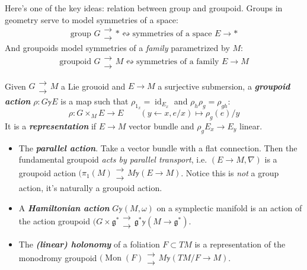 Here's one of the key ideas: relation between group and groupoid. Groups in geometry serve to model symmetries of a space:
\[\text{group } G \substack{\to\\\to} * \leftrightsquigarrow \text{symmetries of a space }E \to * \]
And groupoids model symmetries of a \textit{family} parametrized by \(M\):
\[\text{groupoid }G \substack{\to\\\to}M \leftrightsquigarrow \text{symmetries of a family }E \to M\]
\begin{defn}\leavevmode
Given \(G\substack{\to\\\to}M\) a Lie grouoid and \(E \to M\) a surjective submersion, a \textit{\textbf{groupoid action}} \(\rho:G \mathbb{y} E\) is a map such that \(\rho_{1_x}=\operatorname{id}_{E_x}\) and \(\rho_h\rho_g=\rho_{gh}\):
\[\rho:G \times_M E \to E\qquad (y\leftarrow x,e/x)\mapsto \rho_g(e)/y\]
It is a \textit{\textbf{representation}} if \(E \to M\) vector bundle and \(\rho_g E_x \to E_y\) linear.
\end{defn}

\begin{example}\leavevmode
\begin{itemize}
\item The \textit{\textbf{parallel action}}. Take a vector bundle with a flat connection. Then the fundamental groupoid \textit{acts by parallel transport}, i.e. \((E \to M, \nabla)\) is a groupoid action \((\pi_{1}(M)\substack{\to\\\to}M \mathbb{y} (E \to M)\). Notice this is \textit{not} a group action, it's naturally a groupoid action.
\item A \textit{\textbf{Hamiltonian action}} \(G \mathbb{y}(M,\omega)\) on a symplectic manifold is an action of the action groupoid \((G \times \mathfrak{g}^*\substack{\to\\\to}\mathfrak{g}^*\mathbb{y}(M\to \mathfrak{g}^*)\).
\item The \textit{\textbf{(linear) holonomy}} of a foliation \(F \subset TM\) is a representation of the monodromy groupoid \((\operatorname{Mon}(F) \substack{\to\\\to}M \mathbb{y}(TM/F \to M)\).
\end{itemize}\end{example}

